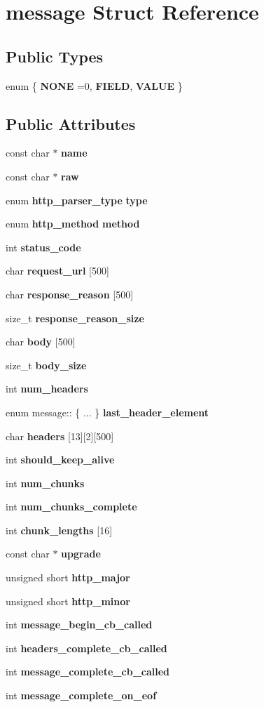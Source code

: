 \section{message Struct Reference}
\label{structmessage}
\subsection*{Public Types}
\begin{DoxyCompactItemize}
\item 
enum \{ {\bf N\+O\+NE} =0, 
{\bf F\+I\+E\+LD}, 
{\bf V\+A\+L\+UE}
 \}
\end{DoxyCompactItemize}
\subsection*{Public Attributes}
\begin{DoxyCompactItemize}
\item 
const char $\ast$ {\bf name}
\item 
const char $\ast$ {\bf raw}
\item 
enum {\bf http\+\_\+parser\+\_\+type} {\bf type}
\item 
enum {\bf http\+\_\+method} {\bf method}
\item 
int {\bf status\+\_\+code}
\item 
char {\bf request\+\_\+url} [500]
\item 
char {\bf response\+\_\+reason} [500]
\item 
size\+\_\+t {\bf response\+\_\+reason\+\_\+size}
\item 
char {\bf body} [500]
\item 
size\+\_\+t {\bf body\+\_\+size}
\item 
int {\bf num\+\_\+headers}
\item 
enum message\+:: \{ ... \}  {\bf last\+\_\+header\+\_\+element}
\item 
char {\bf headers} [13][2][500]
\item 
int {\bf should\+\_\+keep\+\_\+alive}
\item 
int {\bf num\+\_\+chunks}
\item 
int {\bf num\+\_\+chunks\+\_\+complete}
\item 
int {\bf chunk\+\_\+lengths} [16]
\item 
const char $\ast$ {\bf upgrade}
\item 
unsigned short {\bf http\+\_\+major}
\item 
unsigned short {\bf http\+\_\+minor}
\item 
int {\bf message\+\_\+begin\+\_\+cb\+\_\+called}
\item 
int {\bf headers\+\_\+complete\+\_\+cb\+\_\+called}
\item 
int {\bf message\+\_\+complete\+\_\+cb\+\_\+called}
\item 
int {\bf message\+\_\+complete\+\_\+on\+\_\+eof}
\end{DoxyCompactItemize}


